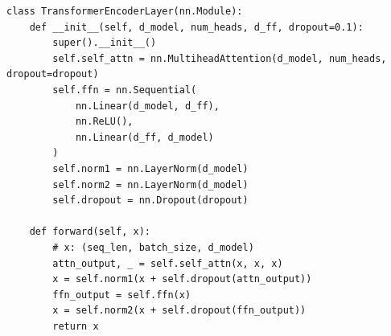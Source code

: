 \begin{listing}
    \begin{verbatim}
class TransformerEncoderLayer(nn.Module):
    def __init__(self, d_model, num_heads, d_ff, dropout=0.1):
        super().__init__()
        self.self_attn = nn.MultiheadAttention(d_model, num_heads, dropout=dropout)
        self.ffn = nn.Sequential(
            nn.Linear(d_model, d_ff),
            nn.ReLU(),
            nn.Linear(d_ff, d_model)
        )
        self.norm1 = nn.LayerNorm(d_model)
        self.norm2 = nn.LayerNorm(d_model)
        self.dropout = nn.Dropout(dropout)

    def forward(self, x):
        # x: (seq_len, batch_size, d_model)
        attn_output, _ = self.self_attn(x, x, x)
        x = self.norm1(x + self.dropout(attn_output))
        ffn_output = self.ffn(x)
        x = self.norm2(x + self.dropout(ffn_output))
        return x
    \end{verbatim}
    \caption{Minimal Transformer Implmentation}\label{lst:transformer}
\end{listing}
